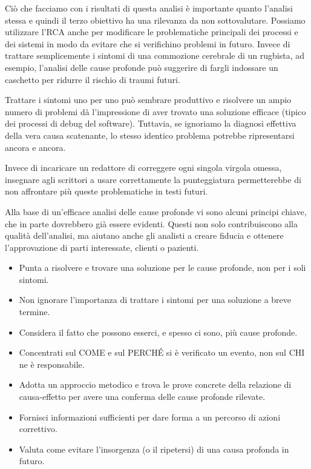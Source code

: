 Ciò che facciamo con i risultati di questa analisi è importante quanto l'analisi stessa e quindi il terzo obiettivo ha una rilevanza da non sottovalutare. Possiamo utilizzare l'RCA anche per modificare le problematiche principali dei processi e dei sistemi in modo da evitare che si verifichino problemi in futuro. Invece di trattare semplicemente i sintomi di una commozione cerebrale di un rugbista, ad esempio, l'analisi delle cause profonde può suggerire di fargli indossare un caschetto per ridurre il rischio di traumi futuri.

Trattare i sintomi uno per uno può sembrare produttivo e risolvere un ampio numero di problemi dà l'impressione di aver trovato una soluzione efficace (tipico dei processi di debug del software). Tuttavia, se ignoriamo la diagnosi effettiva della vera causa scatenante, lo stesso identico problema potrebbe ripresentarsi ancora e ancora. 

Invece di incaricare un redattore di correggere ogni singola virgola omessa, insegnare agli scrittori a usare correttamente la punteggiatura permetterebbe di non affrontare più queste problematiche in testi futuri.

Alla base di un'efficace analisi delle cause profonde vi sono alcuni principi chiave, che in parte dovrebbero già essere evidenti. Questi non solo contribuiscono alla qualità dell'analisi, ma aiutano anche gli analisti a creare fiducia e ottenere l'approvazione di parti interessate, clienti o pazienti.

\begin{itemize}
    \item Punta a risolvere e trovare una soluzione per le cause profonde, non per i soli sintomi.
    \item Non ignorare l'importanza di trattare i sintomi per una soluzione a breve termine.
    \item Considera il fatto che possono esserci, e spesso ci sono, più cause profonde.
    \item Concentrati sul COME e sul PERCHÉ si è verificato un evento, non sul CHI ne è responsabile.
    \item Adotta un approccio metodico e trova le prove concrete della relazione di causa-effetto per avere una conferma delle cause profonde rilevate.
    \item Fornisci informazioni sufficienti per dare forma a un percorso di azioni correttivo.
    \item Valuta come evitare l'insorgenza (o il ripetersi) di una causa profonda in futuro.

\end{itemize}

